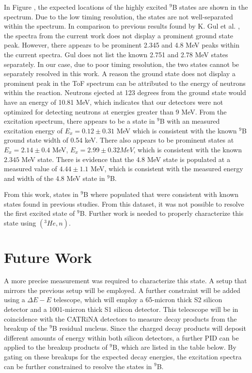 \documentclass[11pt,copyright]{fsuthesis}
\begin{document}
In Figure , the expected locations of the highly excited $^9$B states are shown in the spectrum. Due to the low timing resolution, the states are not well-separated within the spectrum. In comparison to previous results found by K. Gul et al. \cite{gul197018o}, the spectra from the current work does not display a prominent ground state peak. However, there appears to be prominent 2.345 and 4.8 MeV peaks within the current spectra. Gul does not list the known 2.751 and 2.78 MeV states separately. In our case, due to poor timing resolution, the two states cannot be separately resolved in this work. A reason the ground state does not display a prominent peak in the ToF spectrum can be attributed to the energy of neutrons within the reaction. Neutrons ejected at 123 degrees from the ground state would have an energy of 10.81 MeV, which indicates that our detectors were not optimized for detecting neutrons at energies greater than 9 MeV. From the excitation spectrum, there appears to be a state in $^9$B with an measured excitation energy of $E_x = 0.12 \pm 0.31$ MeV which is consistent with the known $^9$B ground state width of 0.54 keV. There also appears to be  prominent states at $E_x = 2.14 \pm 0.4$ MeV, $E_x = 2.99 \pm 0.32 MeV$, which is consistent with the known $2.345$ MeV state. There is evidence that the 4.8 MeV state is populated at a measured value of $4.44 \pm 1.1$ MeV, which is consistent with the measured energy and width of the 4.8 MeV state in $^9$B. 

From this work, states in  $^9$B where populated that were consistent with known states found in previous studies. From this dataset, it was not possible to resolve the first excited state of $^9$B. Further work is needed to properly characterize this state using $(^3He,n)$.

\chapter{Future Work}

A more precise measurement was required to characterize this state. A setup that mirrors the previous setup will be employed. A further constraint will be added using a $\Delta E-E$ telescope, which will employ a 65-micron thick S2 silicon detector and a 1001-micron thick S1 silicon detector. This telecscope will be in coincidence with the CATRiNA detectors to measure decay products from the breakup of the $^9$B residual nucleus. Since the charged decay products will deposit different amounts of energy within both silicon detectors, a further PID can be applied to the breakup products of $^9$B, which are listed in the table below. By gating on these breakups for the expected decay energies, the excitation spectra can be further constrained to resolve the states in $^9$B. \\
\end{document}
